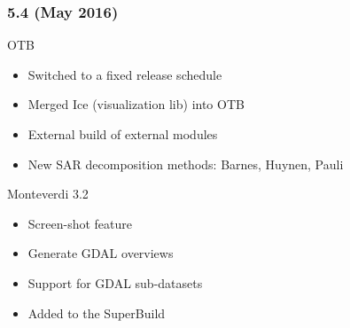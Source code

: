 \begin{frame}
\frametitle{5.4 (May 2016)}
\begin{block}{OTB}
\begin{itemize}
\item Switched to a fixed release schedule
\item Merged Ice (visualization lib) into OTB
\item External build of external modules
\item New SAR decomposition methods: Barnes, Huynen, Pauli
\end{itemize}
\end{block}

\begin{block}{Monteverdi 3.2}
\begin{itemize}
\item Screen-shot feature
\item Generate GDAL overviews
\item Support for GDAL sub-datasets
\item Added to the SuperBuild
\end{itemize}
\end{block}
\end{frame}
